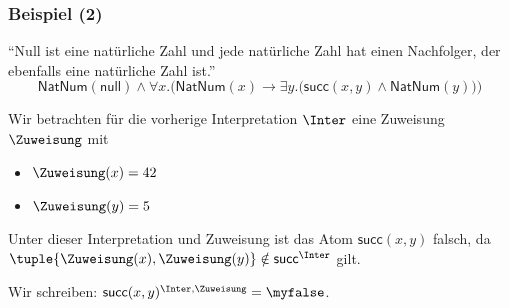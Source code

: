 \documentclass[aspectratio=1610,onlymath]{beamer}
\begin{document}
\begin{frame}[t]\frametitle{Beispiel (2)}

\alert{"`Null ist eine natürliche Zahl und jede natürliche Zahl hat einen Nachfolger, der
ebenfalls eine natürliche Zahl ist."'}
\[ \textsf{NatNum}(\textsf{null})\wedge \forall x.\Big(\textsf{NatNum}(x)\to\exists y.\big(\textsf{succ}(x,y)\wedge \textsf{NatNum}(y)\big)\Big)\]

Wir betrachten für die vorherige Interpretation $\Inter$ 
eine Zuweisung $\Zuweisung$ mit
\begin{itemize}
\item $\Zuweisung(x)=42$
\item $\Zuweisung(y)=5$
\end{itemize}

Unter dieser Interpretation und Zuweisung ist das Atom $\textsf{succ}(x,y)$ falsch, da
$\tuple{\Zuweisung(x),\Zuweisung(y)}\notin\textsf{succ}^\Inter$ gilt.
\smallskip

Wir schreiben: $\textsf{succ}(x,y)^{\Inter,\Zuweisung}=\myfalse$.
\bigskip


\end{frame}
\end{document}
